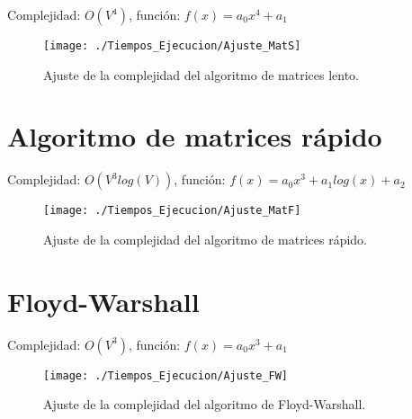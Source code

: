 Complejidad: $O(V^4)$, función: $f(x) = a_0x^4 + a_1$

\begin{figure}[!htb]
	\centering
	\texttt{[image: ./Tiempos\_Ejecucion/Ajuste\_MatS]}
	
	\caption{Ajuste de la complejidad del algoritmo de matrices lento.}
	\label{fig:ajuste_MatS}
\end{figure}

\newpage

\section{Algoritmo de matrices rápido}

Complejidad: $O(V^3log(V))$, función: $f(x) = a_0x^3 + a_1log(x) + a_2$

\begin{figure}[!htb]
	\centering
	\texttt{[image: ./Tiempos\_Ejecucion/Ajuste\_MatF]}
	
	\caption{Ajuste de la complejidad del algoritmo de matrices rápido.}
	\label{fig:ajuste_MatF}
\end{figure}

\section{Floyd-Warshall}

Complejidad: $O(V^3)$, función: $f(x) = a_0x^3 + a_1$

\begin{figure}[!htb]
	\centering
	\texttt{[image: ./Tiempos\_Ejecucion/Ajuste\_FW]}
	
	\caption{Ajuste de la complejidad del algoritmo de Floyd-Warshall.}
	\label{fig:ajuste_FW}
\end{figure}

\endinput
